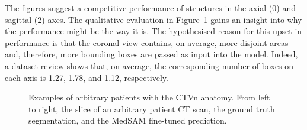 \documentclass[12pt,twoside]{report}
\begin{document}
The figures suggest a competitive performance of structures in the axial (0) and sagittal (2) axes. The qualitative evaluation in Figure~\ref{fig:ctvn-medsam-prediction-all-three-axis} gains an insight into why the performance might be the way it is. The hypothesised reason for this upset in performance is that the coronal view contains, on average, more disjoint areas and, therefore, more bounding boxes are passed as input into the model. Indeed, a dataset review shows that, on average, the corresponding number of boxes on each axis is 1.27, 1.78, and 1.12, respectively. 

\begin{figure}[H]
  \centering
  \caption{Examples of arbitrary patients with the CTVn anatomy. From left to right, the slice of an arbitrary patient CT scan, the ground truth segmentation, and the MedSAM fine-tuned prediction.}\label{fig:ctvn-medsam-prediction-all-three-axis}
\end{figure}
\end{document}
